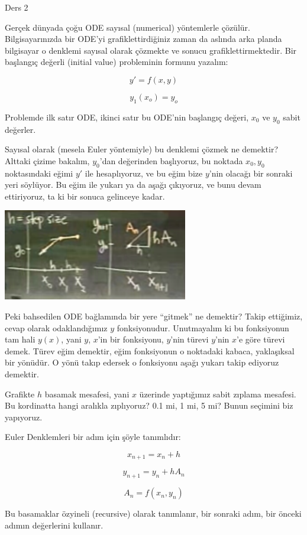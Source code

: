\documentclass[12pt,fleqn]{article}\usepackage{../../common}
\begin{document}
Ders 2

Gerçek dünyada çoğu ODE sayısal (numerical) yöntemlerle
çözülür. Bilgisayarınızda bir ODE'yi grafiklettirdiğiniz zaman da aslında arka
planda bilgisayar o denklemi sayısal olarak çözmekte ve sonucu
grafiklettirmektedir. Bir başlangıç değerli (initial value) probleminin formunu
yazalım: 

$$ y' = f(x,y) $$

$$ y_1(x_o) = y_o $$

Problemde ilk satır ODE, ikinci satır bu ODE'nin başlangıç değeri, $x_0$ ve $y_0$
sabit değerler. 

Sayısal olarak (mesela Euler yöntemiyle) bu denklemi çözmek ne demektir?
Alttaki çizime bakalım, $y_0$'dan değerinden başlıyoruz, bu noktada
$x_0,y_0$ noktasındaki eğimi $y'$ ile hesaplıyoruz, ve bu eğim bize $y$'nin
olacağı bir sonraki yeri söylüyor. Bu eğim ile yukarı ya da aşağı
çıkıyoruz, ve bunu devam ettiriyoruz, ta ki bir sonuca gelinceye kadar.

\includegraphics[height=4cm]{2_1.png}

Peki bahsedilen ODE bağlamında bir yere ``gitmek'' ne demektir? Takip ettiğimiz,
cevap olarak odaklandığımız $y$ fonksiyonudur. Unutmayalım ki bu fonksiyonun tam
hali $y(x)$, yani $y$, $x$'in bir fonksiyonu, $y$'nin türevi $y$'nin $x$'e göre
türevi demek. Türev eğim demektir, eğim fonksiyonun o noktadaki kabaca,
yaklaşıksal bir yönüdür. O yönü takıp edersek o fonksiyonu aşağı yukarı takip
ediyoruz demektir.

Grafikte $h$ basamak mesafesi, yani $x$ üzerinde yaptığımız sabit zıplama
mesafesi. Bu kordinatta hangi aralıkla zıplıyoruz? 0.1 mi, 1 mi, 5 mi? Bunun
seçimini biz yapıyoruz. 

Euler Denklemleri bir adım için şöyle tanımlıdır:

$$ x_{n+1} = x_n + h $$

$$ y_{n+1} = y_n + hA_n $$

$$ A_n = f(x_n, y_n) $$

Bu basamaklar özyineli (recursive) olarak tanımlanır, bir sonraki adım, bir
önceki adımın değerlerini kullanır. 
\end{document}
